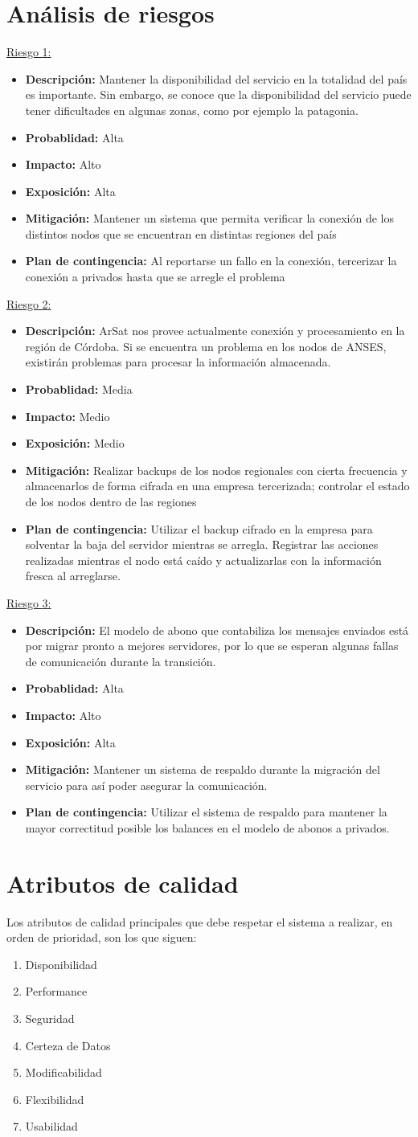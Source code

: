 \documentclass[a4paper, 10pt, twoside]{article}
\newcommand{\riesgo}[7]{
  \underline{Riesgo {#1}:}
  \begin{itemize}   
    \item \textbf{Descripción:} {#2}
    \item \textbf{Probablidad:} {#3}
    \item \textbf{Impacto:} {#4}
    \item \textbf{Exposición:} {#5}
    \item \textbf{Mitigación:} {#6}
    \item \textbf{Plan de contingencia:} {#7}
  \end{itemize}
}
\begin{document}
\section{Análisis de riesgos}

\riesgo{1}
    {Mantener la disponibilidad del servicio en la totalidad del país es importante. Sin embargo, se conoce que la disponibilidad del servicio puede tener dificultades en algunas zonas, como por ejemplo la patagonia.}
    {Alta}
    {Alto}
    {Alta}
    {Mantener un sistema que permita verificar la conexión de los distintos nodos que se encuentran en distintas regiones del país}
    {Al reportarse un fallo en la conexión, tercerizar la conexión a privados hasta que se arregle el problema}

\riesgo{2}
    {ArSat nos provee actualmente conexión y procesamiento en la región de Córdoba. Si se encuentra un problema en los nodos de ANSES, existirán problemas para procesar la información almacenada.}
    {Media}
    {Medio}
    {Medio}
    {Realizar backups de los nodos regionales con cierta frecuencia y almacenarlos de forma cifrada en una empresa tercerizada; controlar el estado de los nodos dentro de las regiones}
    {Utilizar el backup cifrado en la empresa para solventar la baja del servidor mientras se arregla. Registrar las acciones realizadas mientras el nodo está caído y actualizarlas con la información fresca al arreglarse.}

\riesgo{3}
    {El modelo de abono que contabiliza los mensajes enviados está por migrar pronto a mejores servidores, por lo que se esperan algunas fallas de comunicación durante la transición.}
    {Alta}
    {Alto}
    {Alta}
    {Mantener un sistema de respaldo durante la migración del servicio para así poder asegurar la comunicación.}
    {Utilizar el sistema de respaldo para mantener la mayor correctitud posible los balances en el modelo de abonos a privados.}

\newpage

\section{Atributos de calidad}

Los atributos de calidad principales que debe respetar el sistema a realizar, en orden de prioridad, son los que siguen:

\begin{enumerate}
\item Disponibilidad
\item Performance
\item Seguridad
\item Certeza de Datos
\item Modificabilidad
\item Flexibilidad
\item Usabilidad
\end{enumerate}
\end{document}
